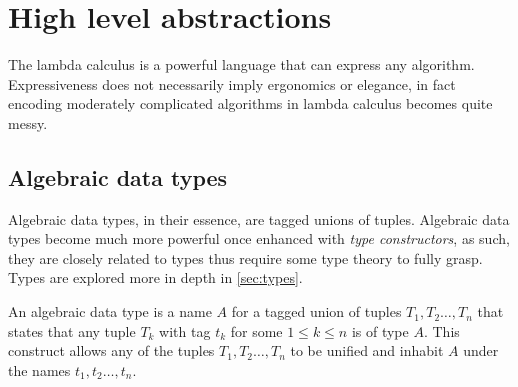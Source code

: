 \documentclass[11pt,oneside,a4paper]{report}
\begin{document}
\section{High level abstractions}\label{sec:highlevel}
The lambda calculus is a powerful language that can express any algorithm.
Expressiveness does not necessarily imply ergonomics or elegance, in fact encoding moderately complicated algorithms in lambda calculus becomes quite messy.

\subsection{Algebraic data types}
\label{sec:adt}
Algebraic data types, in their essence, are tagged unions of tuples.
Algebraic data types become much more powerful once enhanced with \textit{type constructors}, as such, they are closely related to types thus require some type theory to fully grasp.
Types are explored more in depth in \autoref{sec:types}.

An algebraic data type is a name $A$ for a tagged union of tuples $T_1, T_2 \dots , T_n$ that states that any tuple $T_k$ with tag $t_k$ for some $1 \leq k \leq n$ is of type $A$.
This construct allows any of the tuples $T_1, T_2 \dots , T_n$ to be unified and inhabit $A$ under the names $t_1, t_2 \dots , t_n$.
\end{document}
